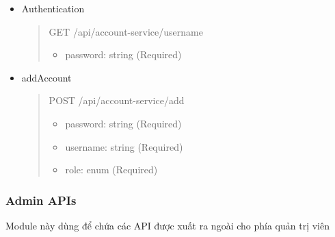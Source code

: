 \begin{itemize}
	\item Authentication
	      \begin{quote}
		      GET /api/account-service/{username}
		      \begin{itemize}
			      \item password: string (Required)
		      \end{itemize}
	      \end{quote}

	\item addAccount
	      \begin{quote}
		      POST /api/account-service/add
		      \begin{itemize}
			      \item password: string (Required)
			      \item username: string (Required)
			      \item role: enum (Required)
		      \end{itemize}
	      \end{quote}
\end{itemize}





\subsubsection{Admin APIs}
Module này dùng để chứa các API được xuất ra ngoài cho phía quản trị viên

